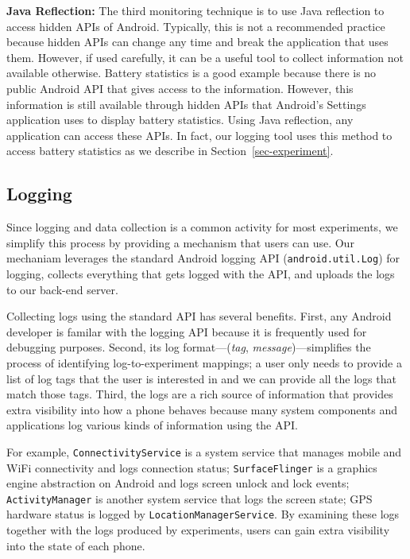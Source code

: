 {\bf Java Reflection:} The third monitoring technique is to use Java reflection
to access hidden APIs of Android. Typically, this is not a recommended practice
because hidden APIs can change any time and break the application that uses
them. However, if used carefully, it can be a useful tool to collect information
not available otherwise. Battery statistics is a good example because there is
no public Android API that gives access to the information. However, this
information is still available through hidden APIs that Android's Settings
application uses to display battery statistics. Using Java reflection, any
application can access these APIs. In fact, our logging tool uses this method to
access battery statistics as we describe in Section~\ref{sec-experiment}.

\subsection{Logging}

Since logging and data collection is a common activity for most experiments, we
simplify this process by providing a mechanism that \PhoneLab{} users can use.
Our mechaniam leverages the standard Android logging API
(\texttt{android.util.Log}) for logging, collects everything that gets logged
with the API, and uploads the logs to our back-end server.

Collecting logs using the standard API has several benefits. First, any Android
developer is familar with the logging API because it is frequently used for
debugging purposes. Second, its log format---({\it tag}, {\it
message})---simplifies the process of identifying log-to-experiment mappings; a
\PhoneLab{} user only needs to provide a list of log tags that the user is
interested in and we can provide all the logs that match those tags. Third, the
logs are a rich source of information that provides extra visibility into how a
phone behaves because many system components and applications log various kinds
of information using the API.

For example, \texttt{ConnectivityService} is a system service that manages
mobile and WiFi connectivity and logs connection status; \texttt{SurfaceFlinger}
is a graphics engine abstraction on Android and logs screen unlock and lock
events; \texttt{ActivityManager} is another system service that logs the screen
state; GPS hardware status is logged by \texttt{LocationManagerService}. By
examining these logs together with the logs produced by experiments, \PhoneLab{}
users can gain extra visibility into the state of each phone.
